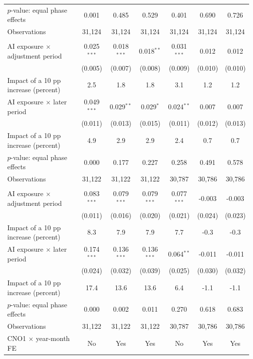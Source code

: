 \begin{landscape}
\begin{table}[H]
\begin{threeparttable}
\begin{tabular}{lcccccc}
$p$-value: equal phase effects & 0.001 & 0.485 & 0.529 & 0.401 & 0.690 & 0.726 \\
Observations & 31,124 & 31,124 & 31,124 & 31,124 & 31,124 & 31,124 \\
\addlinespace
\multicolumn{7}{l}{\textbf{Panel C. Alternative exposure: cosine-weighted}} \\
AI exposure $\times$ adjustment period & 0.025$^{***}$ & 0.018$^{***}$ & 0.018$^{**}$ & 0.031$^{***}$ & 0.012 & 0.012 \\
 & (0.005) & (0.007) & (0.008) & (0.009) & (0.010) & (0.010) \\
Impact of a 10 pp increase (percent) & 2.5 & 1.8 & 1.8 & 3.1 & 1.2 & 1.2 \\
\addlinespace
AI exposure $\times$ later period & 0.049$^{***}$ & 0.029$^{**}$ & 0.029$^{*}$ & 0.024$^{**}$ & 0.007 & 0.007 \\
 & (0.011) & (0.013) & (0.015) & (0.011) & (0.012) & (0.013) \\
Impact of a 10 pp increase (percent) & 4.9 & 2.9 & 2.9 & 2.4 & 0.7 & 0.7 \\
$p$-value: equal phase effects & 0.000 & 0.177 & 0.227 & 0.258 & 0.491 & 0.578 \\
Observations & 31,122 & 31,122 & 31,122 & 30,787 & 30,786 & 30,786 \\
\addlinespace
\multicolumn{7}{l}{\textbf{Panel D. Alternative exposure: RF-relative}} \\
AI exposure $\times$ adjustment period & 0.083$^{***}$ & 0.079$^{***}$ & 0.079$^{***}$ & 0.077$^{***}$ & -0.003 & -0.003 \\
 & (0.011) & (0.016) & (0.020) & (0.021) & (0.024) & (0.023) \\
Impact of a 10 pp increase (percent) & 8.3 & 7.9 & 7.9 & 7.7 & -0.3 & -0.3 \\
\addlinespace
AI exposure $\times$ later period & 0.174$^{***}$ & 0.136$^{***}$ & 0.136$^{***}$ & 0.064$^{**}$ & -0.011 & -0.011 \\
 & (0.024) & (0.032) & (0.039) & (0.025) & (0.030) & (0.032) \\
Impact of a 10 pp increase (percent) & 17.4 & 13.6 & 13.6 & 6.4 & -1.1 & -1.1 \\
$p$-value: equal phase effects & 0.000 & 0.002 & 0.011 & 0.270 & 0.618 & 0.683 \\
Observations & 31,122 & 31,122 & 31,122 & 30,787 & 30,786 & 30,786 \\
\midrule
CNO1 $\times$ year-month FE & No & Yes & Yes & No & Yes & Yes \\

\end{tabular}
\end{threeparttable}
\end{table}
\end{landscape}
